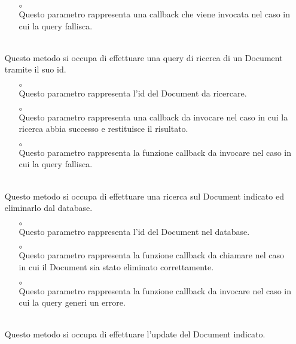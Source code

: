 \begin{itemize}
\begin{itemize}
\item[$\circ$]  \\ Questo parametro rappresenta una callback che viene invocata nel caso in cui la query fallisca.
\end{itemize}
\item[]  \\ Questo metodo si occupa di effettuare una query di ricerca di un Document tramite il suo id.
\begin{itemize}\addtolength{\itemsep}{-0.5\baselineskip}
\item[$\circ$]  \\ Questo parametro rappresenta l'id del Document da ricercare.
\item[$\circ$]  \\ Questo parametro rappresenta una callback da invocare nel caso in cui la ricerca abbia successo e restituisce il risultato.
\item[$\circ$]  \\ Questo parametro rappresenta la funzione callback da invocare nel caso in cui la query fallisca.
\end{itemize}
\item[]  \\ Questo metodo si occupa di effettuare una ricerca sul Document indicato ed eliminarlo dal database.
\begin{itemize}\addtolength{\itemsep}{-0.5\baselineskip}
\item[$\circ$]  \\ Questo parametro rappresenta l'id del Document nel database.
\item[$\circ$]  \\ Questo parametro rappresenta la funzione callback da chiamare nel caso in cui il Document sia stato eliminato correttamente.
\item[$\circ$]  \\ Questo parametro rappresenta la funzione callback da invocare nel caso in cui la query generi un errore.
\end{itemize}
\item[]  \\ Questo metodo si occupa di effettuare l'update del Document indicato.

\end{itemize}
